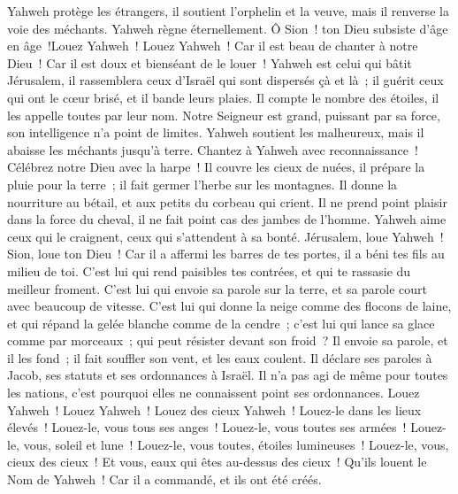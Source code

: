 \begin{multicols}{2}
Yahweh protège les étrangers, il soutient l'orphelin et la veuve, mais il renverse la voie des méchants.
Yahweh règne éternellement. Ô Sion~! ton Dieu subsiste d'âge en âge~!Louez Yahweh~!
\VerseOne{}Louez Yahweh~! Car il est beau de chanter à notre Dieu~! Car il est doux et bienséant de le louer~!
Yahweh est celui qui bâtit Jérusalem, il rassemblera ceux d'Israël qui sont dispersés çà et là~;
il guérit ceux qui ont le cœur brisé, et il bande leurs plaies.
Il compte le nombre des étoiles, il les appelle toutes par leur nom.
Notre Seigneur est grand, puissant par sa force, son intelligence n'a point de limites.
Yahweh soutient les malheureux, mais il abaisse les méchants jusqu'à terre.
Chantez à Yahweh avec reconnaissance~! Célébrez notre Dieu avec la harpe~!
Il couvre les cieux de nuées, il prépare la pluie pour la terre~; il fait germer l'herbe sur les montagnes.
Il donne la nourriture au bétail, et aux petits du corbeau qui crient.
Il ne prend point plaisir dans la force du cheval, il ne fait point cas des jambes de l'homme.
Yahweh aime ceux qui le craignent, ceux qui s'attendent à sa bonté.
Jérusalem, loue Yahweh~! Sion, loue ton Dieu~!
Car il a affermi les barres de tes portes, il a béni tes fils au milieu de toi.
C'est lui qui rend paisibles tes contrées, et qui te rassasie du meilleur froment.
C'est lui qui envoie sa parole sur la terre, et sa parole court avec beaucoup de vitesse.
C'est lui qui donne la neige comme des flocons de laine, et qui répand la gelée blanche comme de la cendre~;
c'est lui qui lance sa glace comme par morceaux~; qui peut résister devant son froid~?
Il envoie sa parole, et il les fond~; il fait souffler son vent, et les eaux coulent.
Il déclare ses paroles à Jacob, ses statuts et ses ordonnances à Israël.
Il n'a pas agi de même pour toutes les nations, c'est pourquoi elles ne connaissent point ses ordonnances. Louez Yahweh~!
\VerseOne{}Louez Yahweh~! Louez des cieux Yahweh~! Louez-le dans les lieux élevés~!
Louez-le, vous tous ses anges~! Louez-le, vous toutes ses armées~!
Louez-le, vous, soleil et lune~! Louez-le, vous toutes, étoiles lumineuses~!
Louez-le, vous, cieux des cieux~! Et vous, eaux qui êtes au-dessus des cieux~!
Qu'ils louent le Nom de Yahweh~! Car il a commandé, et ils ont été créés.

\end{multicols}
